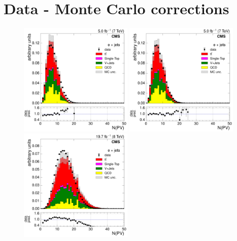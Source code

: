 \section{Data - Monte Carlo corrections}
\label{as:data_monte_carlo_corrections}
\begin{figure}[H]
    \centering
      \includegraphics[width=0.48\textwidth]{Chapters/07_08_09_Analysis/Images/control_plots/before_fit/7TeV/EPlusJets_nVertex_with_ratio}\hfill
      \includegraphics[width=0.48\textwidth]{Chapters/07_08_09_Analysis/Images/control_plots/before_fit/7TeV/EPlusJets_nVertex_reweighted_with_ratio}\\
      \includegraphics[width=0.48\textwidth]{Chapters/07_08_09_Analysis/Images/control_plots/before_fit/8TeV/EPlusJets_nVertex_with_ratio}\hfill

\end{figure}
